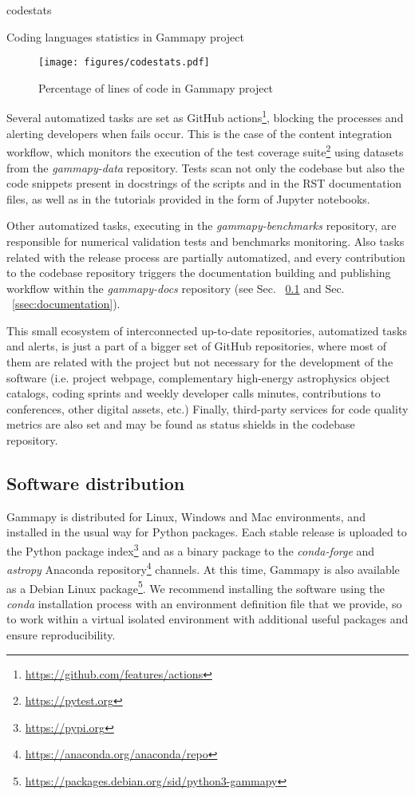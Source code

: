 \begin{table}
	{codestats}
	\caption{Coding languages statistics in Gammapy project}
	\label{table:codestats:data}
\end{table}

\begin{figure}[t]
	\centering
	\texttt{[image: figures/codestats.pdf]}
	\caption{
		Percentage of lines of code in Gammapy project} \label{fig:codestats:lang}
\end{figure}

Several automatized tasks are set as GitHub actions\footnote{\url{https://github.com/features/actions}}, blocking the processes and alerting developers when fails occur. This is the case of the content integration workflow, which monitors the execution of the test coverage suite\footnote{\url{https://pytest.org}} using datasets from the \textit{gammapy-data} repository. Tests scan not only the codebase but also the code snippets present in docstrings of the scripts and in the RST documentation files, as well as in the tutorials provided in the form of Jupyter notebooks. 

Other automatized tasks, executing in the \textit{gammapy-benchmarks} repository, are responsible for numerical validation tests and benchmarks monitoring. Also tasks related with the release process are partially automatized, and every contribution to the codebase repository triggers the documentation building and publishing workflow within the \textit{gammapy-docs} repository (see Sec. ~\ref{ssec:software-distribution} and Sec. ~\ref{ssec:documentation}).

This small ecosystem of interconnected up-to-date repositories, automatized tasks and alerts, is just a part of a bigger set of GitHub repositories, where most of them are related with the project but not necessary for the development of the software (i.e. project webpage, complementary high-energy astrophysics object catalogs, coding sprints and weekly developer calls minutes, contributions to conferences, other digital assets, etc.) Finally, third-party services for code quality metrics are also set and may be found as status shields in the codebase repository.

\subsection{Software distribution}
\label{ssec:software-distribution}

Gammapy is distributed for Linux, Windows and Mac environments, and installed in the usual way for Python packages. Each stable release is uploaded to the Python package index\footnote{\url{https://pypi.org}} and as a binary package to the \textit{conda-forge} and \textit{astropy} Anaconda repository\footnote{\url{https://anaconda.org/anaconda/repo}} channels. At this time, Gammapy is also available as a Debian Linux package\footnote{\url{https://packages.debian.org/sid/python3-gammapy}}. We recommend installing the software using the \textit{conda} installation process with an environment definition file that we provide, so to work within a virtual isolated environment with additional useful packages and ensure reproducibility. 


